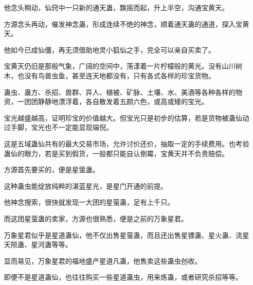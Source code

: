 \begin{this_body}
他念头稍动，仙窍中一只新的通天蛊，飘摇而起，升上半空，沟通宝黄天。

方源念头再动，催发神念蛊，形成连续不绝的神念，顺着通天蛊的通道，探入宝黄天。

他如今已成仙僵，再无须借助地灵小狐仙之手，完全可以亲自买卖了。

宝黄天仍旧是那般气象，广阔的空间中，荡漾着一片柠檬般的黄光。没有山川树木，也没有鸟兽虫鱼，甚至连天地都没有，只有各式各样的珍宝货物。

蛊虫、蛊方、杀招、兽群、异人、植被、矿脉、土壤、水、美酒等各种各样的物资，一团团静静地漂浮着，各自散发着五颜六色，或高或矮的宝光。

宝光越盛越高，证明珍宝的价值越大。但宝光只是初步的估算，若是货物被蛊仙动过手脚，宝光也不一定能显现端倪。

这是五域蛊仙共有的最大交易市场，允许讨价还价，抽取一定的手续费用。也考验蛊仙的眼力，若是买到假货，一般都只能自认倒霉，宝黄天并不负责赔偿。

方源首先要买的，便是星萤蛊。

这种蛊虫能绽放纯粹的湛蓝星光，是星门开通的前提。

他神念搜索，很快就发现一大团的星萤蛊，足有上千只。

而这团星萤蛊的卖家，方源也很熟悉，便是之前的万象星君。

万象星君似乎是星道蛊仙，他不仅出售星萤蛊，而且还出售星镖蛊、星火蛊、流星天陨蛊、星河蛊等等。

显而易见，万象星君的福地盛产星道凡蛊，他售卖这些蛊虫创收。

即便不是星道蛊仙，也往往购买一些星道蛊虫，用来炼蛊，或者研究杀招等等。

\end{this_body}

